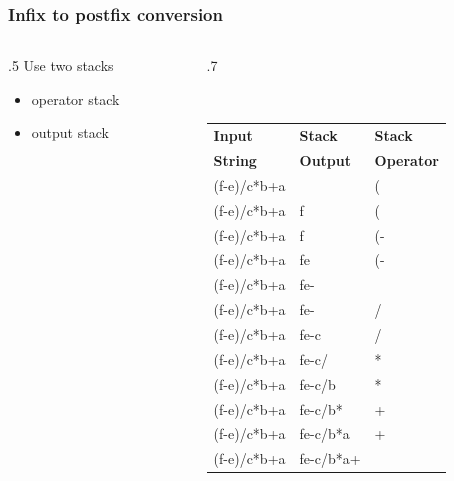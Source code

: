 \documentclass{beamer}
\begin{document}







\begin{frame}\frametitle{Infix to postfix conversion}
	\begin{columns}[T] %
	\begin{column}{.5\linewidth} %
	    	Use two stacks
		\begin{itemize}
			\item
			operator stack
			\item
			output stack
		\end{itemize}
	\end{column} %
	\begin{column}{.7\linewidth} %
	
			\vspace{-0.8cm}
{\small 
{\tt %
\begin{center}
\begin{tabular}{|l|l|l|}
\hline
\textbf{Input } &\textbf{Stack} &\textbf{Stack}\\
\textbf{String} &\textbf{Output} &\textbf{Operator}\\
\hline
(f-e)/c*b+a & &(\\
(f-e)/c*b+a &f &(\\
(f-e)/c*b+a &f &(-\\
(f-e)/c*b+a &fe &(-\\
(f-e)/c*b+a &fe- &\\
(f-e)/c*b+a &fe- &/\\
(f-e)/c*b+a &fe-c &/\\
(f-e)/c*b+a &fe-c/ &*\\
(f-e)/c*b+a &fe-c/b &*\\
(f-e)/c*b+a &fe-c/b* &+\\
(f-e)/c*b+a &fe-c/b*a &+\\
(f-e)/c*b+a &fe-c/b*a+ &\\
\hline
\end{tabular}
\end{center}
}}

	\end{column} %
	\end{columns} %
\end{frame}
\end{document}
